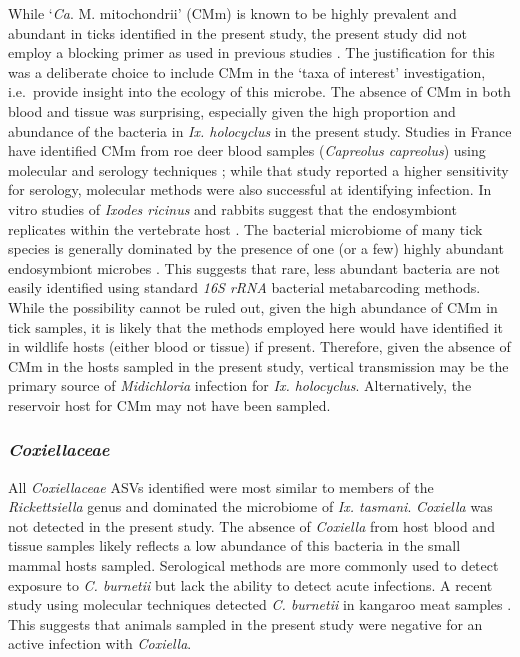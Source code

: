 \documentclass[a4paper, nobind]{templates/ociamthesis}
\begin{document}
While `\emph{Ca}. M. mitochondrii' (CMm) is known to be highly prevalent and abundant in ticks identified in the present study, the present study did not employ a blocking primer as used in previous studies \autocite{goftonInhibitionEndosymbiontCandidatus2015,eganBacterialCommunityProfiling2020}.
The justification for this was a deliberate choice to include CMm in the `taxa of interest' investigation, i.e.~provide insight into the ecology of this microbe.
The absence of CMm in both blood and tissue was surprising, especially given the high proportion and abundance of the bacteria in \emph{Ix. holocyclus} in the present study.
Studies in France have identified CMm from roe deer blood samples (\emph{Capreolus capreolus}) using molecular and serology techniques \autocite{serraMolecularSerologicalEvidence2018}; while that study reported a higher sensitivity for serology, molecular methods were also successful at identifying infection.
In vitro studies of \emph{Ixodes ricinus} and rabbits suggest that the endosymbiont replicates within the vertebrate host \autocite{cafisoMidichloriaMitochondriiEndosymbiont2019}.
The bacterial microbiome of many tick species is generally dominated by the presence of one (or a few) highly abundant endosymbiont microbes \autocite{claytonCharacterizationManipulationBacterial2015,goftonInhibitionEndosymbiontCandidatus2015,varela-stokesMicrobialCommunitiesNorth2017}.
This suggests that rare, less abundant bacteria are not easily identified using standard \emph{16S rRNA} bacterial metabarcoding methods.
While the possibility cannot be ruled out, given the high abundance of CMm in tick samples, it is likely that the methods employed here would have identified it in wildlife hosts (either blood or tissue) if present.
Therefore, given the absence of CMm in the hosts sampled in the present study, vertical transmission may be the primary source of \emph{Midichloria} infection for \emph{Ix. holocyclus}. Alternatively, the reservoir host for CMm may not have been sampled.

\hypertarget{coxiellaceae-1}{%
\subsubsection{\texorpdfstring{\emph{Coxiellaceae}}{Coxiellaceae}}\label{coxiellaceae-1}}

All \emph{Coxiellaceae} ASVs identified were most similar to members of the \emph{Rickettsiella} genus and dominated the microbiome of \emph{Ix. tasmani}.
\emph{Coxiella} was not detected in the present study.
The absence of \emph{Coxiella} from host blood and tissue samples likely reflects a low abundance of this bacteria in the small mammal hosts sampled.
Serological methods are more commonly used to detect exposure to \emph{C. burnetii} \autocite{cooperSerologicalEvidenceCoxiella2012} but lack the ability to detect acute infections.
A recent study using molecular techniques detected \emph{C. burnetii} in kangaroo meat samples \autocite{shapiroMolecularDetectionCoxiella2020}. This suggests that animals sampled in the present study were negative for an active infection with \emph{Coxiella}.
\end{document}
